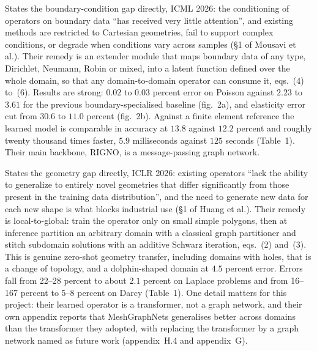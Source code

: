 \documentclass[11pt, a4paper]{article}
\begin{document}
\begin{description}[style=nextline]
  \item[Mousavi, Mishra and De Lorenzis~\citep{bcextension}]
  States the boundary-condition gap directly, ICML 2026: the conditioning of
  operators on boundary data ``has received very little attention'', and
  existing methods are restricted to Cartesian geometries, fail to support
  complex conditions, or degrade when conditions vary across samples (\S{}1 of
  Mousavi et al.). Their remedy is an extender module that maps boundary data
  of any type, Dirichlet, Neumann, Robin or mixed, into a latent function
  defined over the whole domain, so that any domain-to-domain operator can
  consume it, eqs.~(4) to~(6). Results are strong: $0.02$ to $0.03$ percent
  error on Poisson against $2.23$ to $3.61$ for the previous
  boundary-specialised baseline (fig.~2a), and elasticity error cut from
  $30.6$ to $11.0$ percent (fig.~2b). Against a finite element reference the
  learned model is comparable in accuracy at $13.8$ against $12.2$ percent and
  roughly twenty thousand times faster, $5.9$ milliseconds against $125$
  seconds (Table~1). Their main backbone, RIGNO, is a message-passing graph
  network.
  \item[Huang et al., Schwarz neural inference~\citep{domaindecomp}]
  States the geometry gap directly, ICLR 2026: existing operators ``lack the
  ability to generalize to entirely novel geometries that differ significantly
  from those present in the training data distribution'', and the need to
  generate new data for each new shape is what blocks industrial use (\S{}1 of
  Huang et al.). Their remedy is local-to-global: train the operator only on
  small simple polygons, then at inference partition an arbitrary domain with
  a classical graph partitioner and stitch subdomain solutions with an
  additive Schwarz iteration, eqs.~(2) and~(3). This is genuine zero-shot
  geometry transfer, including domains with holes, that is a change of
  topology, and a dolphin-shaped domain at $4.5$ percent error. Errors fall
  from 22--28 percent to about $2.1$ percent on Laplace problems and from
  16--167 percent to 5--8 percent on Darcy (Table~1). One detail matters for
  this project: their learned operator is a transformer, not a graph network,
  and their own appendix reports that MeshGraphNets generalises better across
  domains than the transformer they adopted, with replacing the transformer by
  a graph network named as future work (appendix~H.4 and appendix~G).
\end{description}
\end{document}
